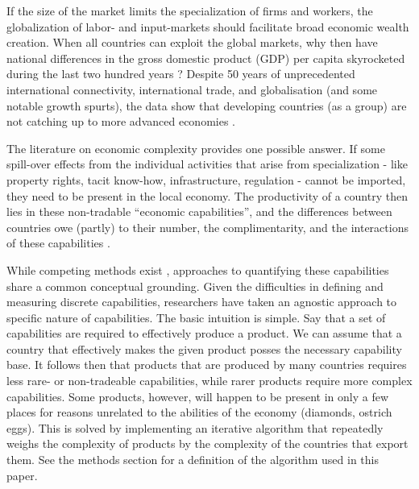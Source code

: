 \documentclass[11pt]{article}
\begin{document}
If the size of the market limits the specialization of firms and workers, the globalization of labor- and input-markets should facilitate broad economic wealth creation. When all countries can exploit the global markets, why then have national differences in the gross domestic product (GDP) per capita skyrocketed during the last two hundred years \citep{pritchett_divergence_1997}? Despite 50 years of unprecedented international connectivity, international trade, and globalisation (and some notable growth spurts), the data show that developing countries (as a group) are not catching up to more advanced economies \citep{johnson_what_2020}.

The literature on economic complexity provides one possible answer. If some spill-over effects from the individual activities that arise from  specialization - like property rights, tacit know-how, infrastructure, regulation - cannot be imported, they need to be present in the local economy. The productivity of a country then lies in these non-tradable ``economic capabilities'', and the differences between countries owe (partly) to their number, the complimentarity, and the interactions of these capabilities \citep{hidalgo_product_2007,hausmann_atlas_2013}.

While competing methods exist \citep{tacchella_new_2012,hidalgo_building_2009,inoua_simple_2016}, approaches to quantifying these capabilities share a common conceptual grounding. Given the difficulties in defining and measuring discrete capabilities, researchers have taken an agnostic approach to specific nature of capabilities. The basic intuition is simple. Say that a set of capabilities are required to effectively produce a product. We can assume that a country that effectively makes the given product posses the necessary capability base. It follows then that products that are produced by many countries requires less rare- or non-tradeable capabilities, while rarer products require more complex capabilities. Some products, however, will happen to be present in only a few places for reasons unrelated to the abilities of the economy (diamonds, ostrich eggs). This is solved by implementing an iterative algorithm that repeatedly weighs the complexity of products by the complexity of the countries that export them. See the methods section for a definition of the algorithm used in this paper.
\end{document}
